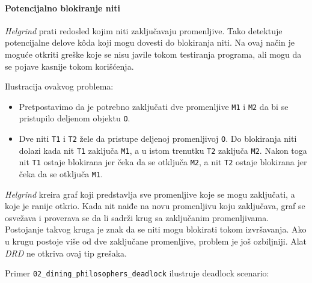 \paragraph{Potencijalno blokiranje niti}\label{potencijalno-blokiranje-niti}

\emph{Helgrind} prati redosled kojim niti zaključavaju promenljive. Tako detektuje potencijalne delove kôda koji mogu dovesti do blokiranja niti. Na ovaj način je moguće otkriti greške koje se nisu javile tokom testiranja programa, ali mogu da se pojave kasnije tokom korišćenja.

Ilustracija ovakvog problema:

\begin{itemize}
\item
  Pretpostavimo da je potrebno zaključati dve promenljive \texttt{M1} i \texttt{M2} da bi se pristupilo deljenom objektu \texttt{O}.
\item
  Dve niti \texttt{T1} i \texttt{T2} žele da pristupe deljenoj promenljivoj \texttt{O}. Do blokiranja niti dolazi kada nit \texttt{T1} zaključa \texttt{M1}, a u istom trenutku \texttt{T2} zaključa \texttt{M2}. Nakon toga nit \texttt{T1} ostaje blokirana jer čeka da se otključa \texttt{M2}, a nit \texttt{T2} ostaje blokirana jer čeka da se otključa \texttt{M1}.
\end{itemize}

\emph{Helgrind} kreira graf koji predstavlja sve promenljive koje se mogu zaključati, a koje je ranije otkrio. Kada nit naiđe na novu promenljivu koju zaključava, graf se osvežava i proverava se da li sadrži krug sa zaključanim promenljivama. Postojanje takvog kruga je znak da se niti mogu blokirati tokom izvršavanja. Ako u krugu postoje više od dve zaključane promenljive, problem je još ozbiljniji. Alat \emph{DRD} ne otkriva ovaj tip grešaka.

Primer \texttt{02\_dining\_philosophers\_deadlock} ilustruje deadlock scenario:

